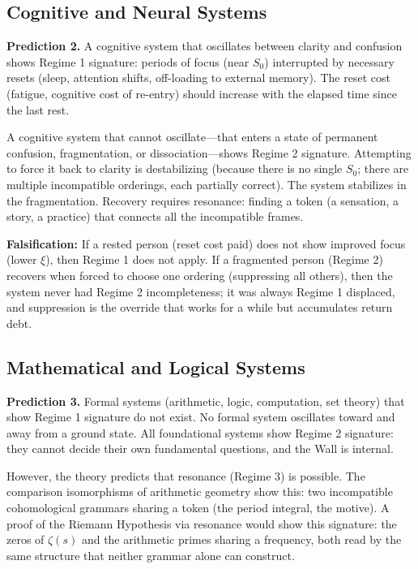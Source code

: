 \documentclass[12pt]{article}
\theoremstyle{definition}
\theoremstyle{remark}
\begin{document}
\subsection{Cognitive and Neural Systems}

\textbf{Prediction 2.} A cognitive system that oscillates between clarity and confusion shows Regime 1 signature: periods of focus (near $S_0$) interrupted by necessary resets (sleep, attention shifts, off-loading to external memory). The reset cost (fatigue, cognitive cost of re-entry) should increase with the elapsed time since the last rest.

A cognitive system that cannot oscillate---that enters a state of permanent confusion, fragmentation, or dissociation---shows Regime 2 signature. Attempting to force it back to clarity is destabilizing (because there is no single $S_0$; there are multiple incompatible orderings, each partially correct). The system stabilizes in the fragmentation. Recovery requires resonance: finding a token (a sensation, a story, a practice) that connects all the incompatible frames.

\textbf{Falsification:} If a rested person (reset cost paid) does not show improved focus (lower $\xi$), then Regime 1 does not apply. If a fragmented person (Regime 2) recovers when forced to choose one ordering (suppressing all others), then the system never had Regime 2 incompleteness; it was always Regime 1 displaced, and suppression is the override that works for a while but accumulates return debt.

\subsection{Mathematical and Logical Systems}

\textbf{Prediction 3.} Formal systems (arithmetic, logic, computation, set theory) that show Regime 1 signature do not exist. No formal system oscillates toward and away from a ground state. All foundational systems show Regime 2 signature: they cannot decide their own fundamental questions, and the Wall is internal.

However, the theory predicts that resonance (Regime 3) is possible. The comparison isomorphisms of arithmetic geometry show this: two incompatible cohomological grammars sharing a token (the period integral, the motive). A proof of the Riemann Hypothesis via resonance would show this signature: the zeros of $\zeta(s)$ and the arithmetic primes sharing a frequency, both read by the same structure that neither grammar alone can construct.
\end{document}
